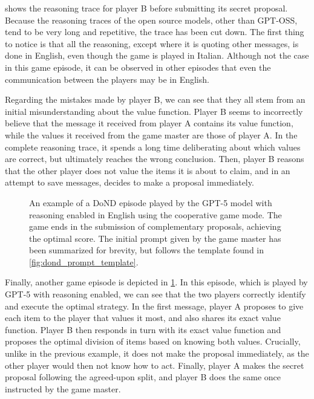 \documentclass[../main.tex]{subfiles}
\begin{document}
 shows the reasoning trace for player B before submitting its secret proposal. Because the reasoning traces of the open source models, other than GPT-OSS, tend to be very long and repetitive, the trace has been cut down. The first thing to notice is that all the reasoning, except where it is quoting other messages, is done in English, even though the game is played in Italian. Although not the case in this game episode, it can be observed in other episodes that even the communication between the players may be in English.

Regarding the mistakes made by player B, we can see that they all stem from an initial misunderstanding about the value function. Player B seems to incorrectly believe that the message it received from player A contains its value function, while the values it received from the game master are those of player A. In the complete reasoning trace, it spends a long time deliberating about which values are correct, but ultimately reaches the wrong conclusion. Then, player B reasons that the other player does not value the items it is about to claim, and in an attempt to save messages, decides to make a proposal immediately.

\begin{figure}[ht!]
  \centering
  
  \caption{An example of a DoND episode played by the GPT-5 model with reasoning enabled in English using the cooperative game mode. The game ends in the submission of complementary proposals, achieving the optimal score. The initial prompt given by the game master has been summarized for brevity, but follows the template found in \cref{fig:dond_prompt_template}.}
  \label{fig:dond_example_en}
\end{figure}

Finally, another game episode is depicted in \cref{fig:dond_example_en}. In this episode, which is played by GPT-5 with reasoning enabled, we can see that the two players correctly identify and execute the optimal strategy. In the first message, player A proposes to give each item to the player that values it most, and also shares its exact value function. Player B then responds in turn with its exact value function and proposes the optimal division of items based on knowing both values. Crucially, unlike in the previous example, it does not make the proposal immediately, as the other player would then not know how to act. Finally, player A makes the secret proposal following the agreed-upon split, and player B does the same once instructed by the game master.
\end{document}
